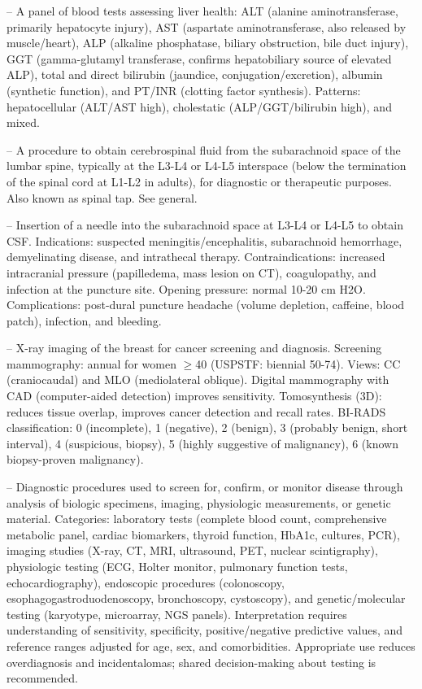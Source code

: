 -- A panel of blood tests assessing liver health: ALT (alanine aminotransferase, primarily hepatocyte injury), AST (aspartate aminotransferase, also released by muscle/heart), ALP (alkaline phosphatase, biliary obstruction, bile duct injury), GGT (gamma-glutamyl transferase, confirms hepatobiliary source of elevated ALP), total and direct bilirubin (jaundice, conjugation/excretion), albumin (synthetic function), and PT/INR (clotting factor synthesis). Patterns: hepatocellular (ALT/AST high), cholestatic (ALP/GGT/bilirubin high), and mixed.

-- A procedure to obtain cerebrospinal fluid from the subarachnoid space of the lumbar spine, typically at the L3-L4 or L4-L5 interspace (below the termination of the spinal cord at L1-L2 in adults), for diagnostic or therapeutic purposes. Also known as spinal tap. See general.

-- Insertion of a needle into the subarachnoid space at L3-L4 or L4-L5 to obtain CSF. Indications: suspected meningitis/encephalitis, subarachnoid hemorrhage, demyelinating disease, and intrathecal therapy. Contraindications: increased intracranial pressure (papilledema, mass lesion on CT), coagulopathy, and infection at the puncture site. Opening pressure: normal 10-20 cm H2O. Complications: post-dural puncture headache (volume depletion, caffeine, blood patch), infection, and bleeding.

-- X-ray imaging of the breast for cancer screening and diagnosis. Screening mammography: annual for women \(\ge\)40 (USPSTF: biennial 50-74). Views: CC (craniocaudal) and MLO (mediolateral oblique). Digital mammography with CAD (computer-aided detection) improves sensitivity. Tomosynthesis (3D): reduces tissue overlap, improves cancer detection and recall rates. BI-RADS classification: 0 (incomplete), 1 (negative), 2 (benign), 3 (probably benign, short interval), 4 (suspicious, biopsy), 5 (highly suggestive of malignancy), 6 (known biopsy-proven malignancy).

-- Diagnostic procedures used to screen for, confirm, or monitor disease through analysis of biologic specimens, imaging, physiologic measurements, or genetic material. Categories: laboratory tests (complete blood count, comprehensive metabolic panel, cardiac biomarkers, thyroid function, HbA1c, cultures, PCR), imaging studies (X-ray, CT, MRI, ultrasound, PET, nuclear scintigraphy), physiologic testing (ECG, Holter monitor, pulmonary function tests, echocardiography), endoscopic procedures (colonoscopy, esophagogastroduodenoscopy, bronchoscopy, cystoscopy), and genetic/molecular testing (karyotype, microarray, NGS panels). Interpretation requires understanding of sensitivity, specificity, positive/negative predictive values, and reference ranges adjusted for age, sex, and comorbidities. Appropriate use reduces overdiagnosis and incidentalomas; shared decision-making about testing is recommended.


